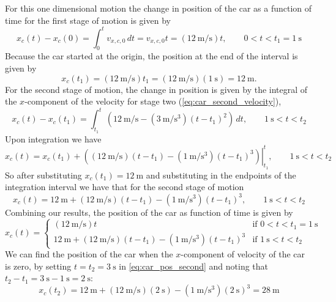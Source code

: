 \documentclass{esg8012exam}
\begin{document}
\begin{solution}
    For this one dimensional motion the change in position of the car as a function of time for the first stage of motion is given by
    $$x_c(t) - x_c(0) = \int_0^t v_{x,c,0}\,dt = v_{x,c,0}t = (\SI{12}{\meter\per\second})t,\qquad 0 < t < t_1 = \SI{1}{\second}$$
    Because the car started at the origin, the position at the end of the interval is given by
    $$x_c(t_1) = (\SI{12}{\meter\per\second})t_1 = (\SI{12}{\meter\per\second})(\SI{1}{\second}) = \SI{12}{\meter}.$$
    For the second stage of motion, the change in position is given by the integral of the $x$-component of the velocity for stage two (\autoref{eq:car_second_velocity}),
    $$x_c(t) - x_c(t_1) = \int_{t_1}^t \left( \SI{12}{\meter\per\second} - (\SI{3}{\meter\per\second\cubed})(t - t_1)^2\right)\,dt,\qquad \SI{1}{\second} < t < t_2$$
    Upon integration we have
    $$x_c(t) = x_c(t_1) + \left.\left( (\SI{12}{\meter\per\second})(t - t_1) - (\SI{1}{\meter\per\second\cubed})(t - t_1)^3\right)\right|_{t_1}^t,\qquad \SI{1}{\second} < t < t_2$$
    So after substituting $x_c(t_1) = \SI{12}{\meter}$ and substituting in the endpoints of the integration interval we have that for the second stage of motion
    \begin{equation}
      x_c(t) = \SI{12}{\meter} + (\SI{12}{\meter\per\second})(t - t_1) - (\SI{1}{\meter\per\second\cubed})(t - t_1)^3,\qquad \SI{1}{\second} < t < t_2 \label{eq:car_pos_second}
    \end{equation}
    Combining our results, the position of the car as function of time is given by
    \begin{equation}
      x_c(t) = \begin{cases}
                (\SI{12}{\meter\per\second})t & \text{if }0 < t < t_1 = \SI{1}{\second} \\
                \SI{12}{\meter} + (\SI{12}{\meter\per\second})(t - t_1) - (\SI{1}{\meter\per\second\cubed})(t - t_1)^3 & \text{if }\SI{1}{\second} < t < t_2
               \end{cases}
    \end{equation}
    We can find the position of the car when the $x$-component of velocity of the car is zero, by setting $t = t_2 = \SI{3}{\second}$ in \autoref{eq:car_pos_second} and noting that $t_2 - t_1 = \SI{3}{\second} - \SI{1}{\second} = \SI{2}{\second}$: 
    \begin{equation}
      x_c(t_2) = \SI{12}{\meter} + (\SI{12}{\meter\per\second})(\SI{2}{\second}) - (\SI{1}{\meter\per\second\cubed})(\SI{2}{\second})^3 = \SI{28}{\meter} \label{eq:car_final_position}
    \end{equation}

\end{solution}
\end{document}
